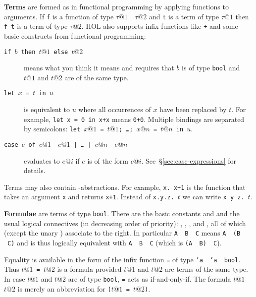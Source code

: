\textbf{Terms} are formed as in functional programming by
applying functions to arguments. If \texttt{f} is a function of type
\texttt{$\tau@1$ \isasymFun~$\tau@2$} and \texttt{t} is a term of type
$\tau@1$ then \texttt{f~t} is a term of type $\tau@2$. HOL also supports
infix functions like \texttt{+} and some basic constructs from functional
programming:
\begin{description}
\item[\texttt{if $b$ then $t@1$ else $t@2$}]
means what you think it means and requires that
$b$ is of type \texttt{bool} and $t@1$ and $t@2$ are of the same type.
\item[\texttt{let $x$ = $t$ in $u$}]
is equivalent to $u$ where all occurrences of $x$ have been replaced by
$t$. For example,
\texttt{let x = 0 in x+x} means \texttt{0+0}. Multiple bindings are separated
by semicolons: \texttt{let $x@1$ = $t@1$; \dots; $x@n$ = $t@n$ in $u$}.
\item[\texttt{case $e$ of $c@1$ \isasymFun~$e@1$ |~\dots~| $c@n$ \isasymFun~$e@n$}]
evaluates to $e@i$ if $e$ is of the form
$c@i$. See~\S\ref{sec:case-expressions} for details.
\end{description}

Terms may also contain
\isasymlambda-abstractions. For example,
\texttt{\isasymlambda{}x.~x+1} is the function that takes an argument
\texttt{x} and returns \texttt{x+1}. Instead of
\texttt{\isasymlambda{}x.\isasymlambda{}y.\isasymlambda{}z.}~$t$ we can write
\texttt{\isasymlambda{}x~y~z.}~$t$.

\textbf{Formulae}
are terms of type \texttt{bool}. There are the basic
constants  and  and the usual logical
connectives (in decreasing order of priority):
,
,
, and
,
all of which (except the unary \isasymnot) associate to the right. In
particular \texttt{A \isasymimp~B \isasymimp~C} means
\texttt{A \isasymimp~(B \isasymimp~C)} and is thus
logically equivalent with \texttt{A \isasymand~B \isasymimp~C}
(which is \texttt{(A \isasymand~B) \isasymimp~C}).

Equality is available in the form of the infix function
\texttt{=} of type \texttt{'a \isasymFun~'a
  \isasymFun~bool}. Thus \texttt{$t@1$ = $t@2$} is a formula provided $t@1$
and $t@2$ are terms of the same type. In case $t@1$ and $t@2$ are of type
\texttt{bool}, \texttt{=} acts as if-and-only-if. The formula
$t@1$~\isasymnoteq~$t@2$ is merely an abbreviation for
\texttt{\isasymnot($t@1$ = $t@2$)}.


